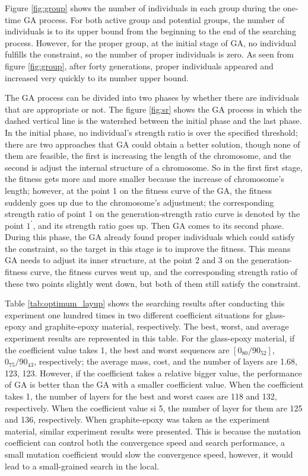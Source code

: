 Figure \ref{fig:group} shows the number of individuals in each group during
the one-time GA process.  For both active group and potential groups, the number of
individuals is to its upper bound from the beginning to the end of the
searching process. However, for the proper group, at the initial stage of GA,
no individual fulfills the constraint, so the number of proper individuals is
zero. As seen from figure \ref{fig:group}, after forty generations, proper
individuals appeared and increased very quickly to its number upper bound.


The GA process can be divided into two phases by whether there are individuals
that are appropriate or not. The figure \ref{fig:sr} shows the GA process in
which the dashed vertical line is the watershed between the initial phase and
the last phase. In the initial phase, no individual's strength ratio is over
the specified threshold; there are two approaches that GA could obtain a better
solution, though none of them are feasible, the first is increasing the length
of the chromosome, and the second is adjust the internal structure of a chromosome. So
in the first first stage, the fitness gets more and more smaller because the
increase of chromosome's length; however, at the point 1 on the fitness curve
of the GA, the fitness suddenly goes up due to the chromosome's adjustment; the
corresponding strength ratio of point 1 on the generation-strength ratio curve
is denoted by the point $1^{\prime}$, and its strength ratio goes up.  Then GA
comes to its second phase. During this phase, the GA already found proper
individuals which could satisfy the constraint, so the target in this stage is
to improve the fitness. This means GA needs to adjust its inner structure, at
the point 2 and 3 on the generation-fitness curve, the fitness curves went up,
and the corresponding strength ratio of these two points slightly went down,
but both of them still satisfy the constraint.



Table \ref{tab:optimum_layup} shows the searching results after conducting this
experiment one hundred times in two different coefficient situations for
glass-epoxy and graphite-epoxy material, respectively. The best, worst, and
average experiment results are represented in this table. For the glass-epoxy
material, if the coefficient value takes 1, the best and worst sequences are
$[0_{80}/90_{52}]$, $0_{75}/90_{43}$, respectively; the average mass, cost, and
the number of layers are 1.68, 123, 123. However, if the coefficient takes a
relative bigger value, the performance of GA is better than the GA with a smaller
coefficient value. When the coefficient takes 1, the number of layers for the
best and worst cases are 118 and 132, respectively. When the coefficient value
si 5, the number of layer for them are 125 and 136, respectively. When
graphite-epoxy was taken as the experiment material, similar experiment
results were presented. This is because the mutation coefficient can control
both the convergence speed and search performance, a small mutation coefficient
would slow the convergence speed, however, it would lead to a small-grained
search in the local. 



